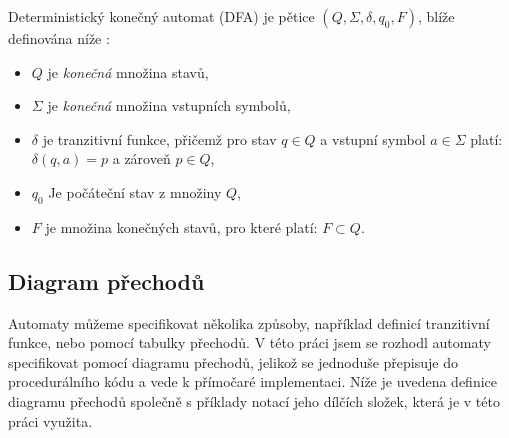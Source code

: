 \begin{definition}
Deterministický konečný automat (DFA) je pětice $(Q, \Sigma, \delta, q_{0}, F)$, blíže definována níže \cite{HopcroftJohnE.2007Itat}:
\begin{itemize}
    \item $Q$ je \emph{konečná} množina stavů,
    \item $\Sigma$ je \emph{konečná} množina vstupních symbolů,
    \item $\delta$ je tranzitivní funkce, přičemž pro stav $q \in Q$ a vstupní symbol $a\in \Sigma$ platí: \linebreak $\delta(q, a) = p$ a zároveň $p \in Q$,
    \item $q_{0}$ Je počáteční stav z množiny $Q$,
    \item $F$ je množina konečných stavů, pro které platí: $F \subset Q$.
\end{itemize}
\end{definition}

\subsection*{Diagram přechodů}
Automaty můžeme specifikovat několika způsoby, například definicí tranzitivní funkce, nebo pomocí tabulky přechodů. V této práci jsem se rozhodl automaty specifikovat pomocí diagramu přechodů, jelikož se jednoduše přepisuje do procedurálního kódu a vede k přímočaré implementaci. Níže je uvedena definice diagramu přechodů společně s příklady notací jeho dílčích složek, která je v této práci využita. 

